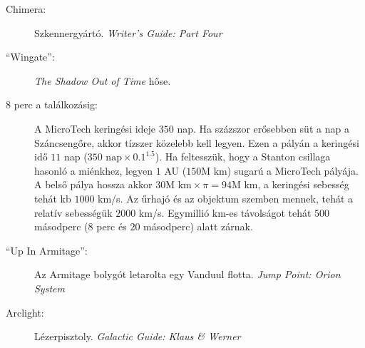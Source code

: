 \documentclass[10pt]{memoir}
\begin{document}
\begin{description}
\item[Chimera:] Szkennergyártó. \textit{Writer's Guide: Part Four}

\item[``Wingate'':] \textit{The Shadow Out of Time} hőse.

\item[8 perc a találkozásig:] A MicroTech keringési ideje $350$ nap. Ha
százszor erősebben süt a nap a Száncsengőre, akkor tízszer közelebb kell
legyen. Ezen a pályán a keringési idő $11$ nap ($350 \mbox{ nap} \times
0.1^{1.5}$). Ha feltesszük, hogy a Stanton csillaga hasonló a miénkhez, legyen
$1$ AU ($150 \mbox{M km}$) sugarú a MicroTech pályája.  A belső pálya hossza
akkor $30 \mbox{M km} \times \pi = 94 \mbox{M km}$, a keringési sebesség tehát
kb $1000$ km/s. Az űrhajó és az objektum szemben mennek, tehát a relatív
sebességük $2000$ km/s. Egymillió km-es távolságot tehát $500$ másodperc ($8$
perc és $20$ másodperc) alatt zárnak.

\item[``Up In Armitage'':] Az Armitage bolygót letarolta egy Vanduul flotta.
\textit{Jump Point: Orion System}

\item[Arclight:] Lézerpisztoly. \textit{Galactic Guide: Klaus \& Werner}
\end{description}

\cleartoverso
\cleartorecto
\end{document}
